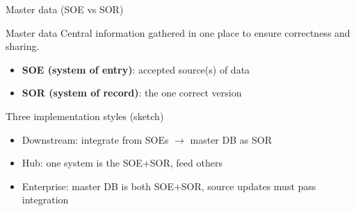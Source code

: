 \documentclass[10pt,aspectratio=169]{beamer}
\newenvironment{examplebox}[1][Example]{\begin{exampleblock}{#1}}{\end{exampleblock}}
\begin{document}
\begin{frame}{Master data (SOE vs SOR)}
\begin{block}{Master data}
Central information gathered in one place to ensure correctness and sharing.
\end{block}
\begin{itemize}
  \item \textbf{SOE (system of entry)}: accepted source(s) of data
  \item \textbf{SOR (system of record)}: the one correct version
\end{itemize}

\begin{examplebox}[Three implementation styles (sketch)]
\begin{itemize}
  \item Downstream: integrate from SOEs \(\rightarrow\) master DB as SOR
  \item Hub: one system is the SOE+SOR, feed others
  \item Enterprise: master DB is both SOE+SOR, source updates must pass integration
\end{itemize}
\end{examplebox}
\end{frame}
\end{document}

